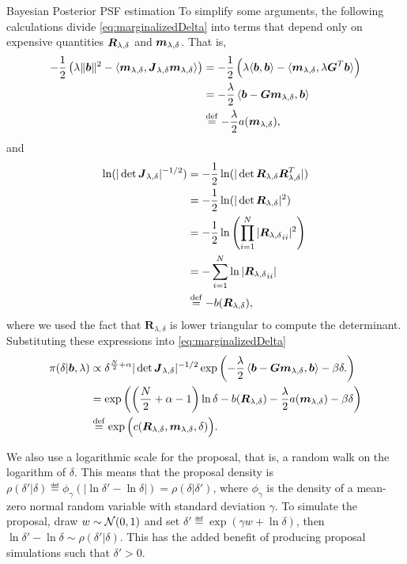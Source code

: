 \begin{chapter}{Bayesian Posterior PSF estimation}
To  simplify some arguments, the following calculations divide \eqref{eq:marginalizedDelta} into terms that depend only on expensive quantities $\mbox{\boldmath$R$}_{\lambda,\delta}$ and $\mbox{\boldmath$m$}_{\lambda,\delta}$. 
That is,
\begin{align}
    -\frac12 \left(\lambda \|\mbox{\boldmath$b$}\|^2- \langle \mbox{\boldmath$m$}_{\lambda,\delta},\mbox{\boldmath$J$}_{\lambda,\delta}\mbox{\boldmath$m$}_{\lambda,\delta}\rangle \right)
    &= -\frac12 \left(\lambda \langle\mbox{\boldmath$b$},\mbox{\boldmath$b$}\rangle- \langle \mbox{\boldmath$m$}_{\lambda,\delta},\lambda \mbox{\boldmath$G$}^T\mbox{\boldmath$b$}\rangle \right)\nonumber \\
    &= -\frac\lambda 2 \left\langle\mbox{\boldmath$b$} - \mbox{\boldmath$G$}\mbox{\boldmath$m$}_{\lambda,\delta},\mbox{\boldmath$b$}\right\rangle \nonumber\\
    &\stackrel{\rm def}{=} -\frac \lambda 2a(\mbox{\boldmath$m$}_{\lambda,\delta}), \label{eq:aConst}
\end{align}
and
\begin{align}
  \ln(|\det \mbox{\boldmath$J$}_{\lambda,\delta}|^{-1/2})
  &= -\frac 12\ln(|\det \mbox{\boldmath$R$}_{\lambda,\delta}\mbox{\boldmath$R$}_{\lambda,\delta}^T|)\nonumber\\
  &= -\frac 12\ln(|\det \mbox{\boldmath$R$}_{\lambda,\delta}|^2)\nonumber\\
  &= -\frac 12\ln\left(\prod_{i=1}^N |{\mbox{\boldmath$R$}_{\lambda,\delta}}_{ii}|^2\right) \nonumber\\
  &= -\sum_{i=1}^N\ln|{\mbox{\boldmath$R$}_{\lambda,\delta}}_{ii}|\nonumber\\
  &\stackrel{\rm def}{=} -b(\mbox{\boldmath$R$}_{\lambda,\delta}), 
\end{align}
where we used the fact that $\bm R_{\lambda,\delta}$ is lower triangular to compute the determinant.
Substituting these expressions into \eqref{eq:marginalizedDelta}
\begin{align}
  \pi(\delta|\mbox{\boldmath$b$},\lambda)
    &\propto \delta^{\frac N2+\alpha}|\det \mbox{\boldmath$J$}_{\lambda,\delta}|^{-1/2}\exp\left( -\frac\lambda 2 \left\langle\mbox{\boldmath$b$} - \mbox{\boldmath$G$}\mbox{\boldmath$m$}_{\lambda,\delta},\mbox{\boldmath$b$}\right\rangle -\beta\delta.  \right) \nonumber \\
    &= \exp\left( \left(\frac N2 +\alpha - 1\right)\ln\delta - b(\mbox{\boldmath$R$}_{\lambda,\delta}) -\frac \lambda 2 a(\mbox{\boldmath$m$}_{\lambda,\delta}) -\beta\delta  \right)\nonumber \\
    &\stackrel{\rm def}{=} \exp\Big( c(\mbox{\boldmath$R$}_{\lambda,\delta},\mbox{\boldmath$m$}_{\lambda,\delta},\delta)  \Big). \label{eq:deltaConstant}
\end{align}

We also use a logarithmic scale for the proposal, that is, a random walk on the logarithm of $\delta$.
This means that the proposal density is $\rho(\delta'|\delta) \eqdef \phi_\gamma(|\ln \delta' - \ln \delta|) =  \rho(\delta|\delta')$, where $\phi_\gamma$ is the density of a mean-zero normal random variable with standard deviation $\gamma$.
To simulate the proposal, draw $w\sim \mathcal{N}(0,1)$ and set $\delta'\eqdef \exp(\gamma w+\ln \delta)$, then $\ln\delta'-\ln\delta \sim \rho(\delta'|\delta)$. 
This has the added benefit of producing proposal simulations such that $\delta'>0$.


\end{chapter}
